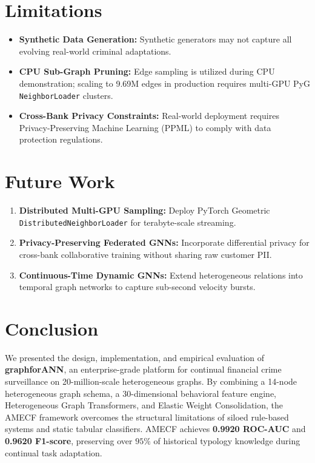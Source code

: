 \documentclass[conference]{IEEEtran}
\begin{document}
\section{Limitations}
\begin{itemize}
    \item \textbf{Synthetic Data Generation:} Synthetic generators may not capture all evolving real-world criminal adaptations.
    \item \textbf{CPU Sub-Graph Pruning:} Edge sampling is utilized during CPU demonstration; scaling to 9.69M edges in production requires multi-GPU PyG \texttt{NeighborLoader} clusters.
    \item \textbf{Cross-Bank Privacy Constraints:} Real-world deployment requires Privacy-Preserving Machine Learning (PPML) to comply with data protection regulations.
\end{itemize}

\section{Future Work}
\begin{enumerate}
    \item \textbf{Distributed Multi-GPU Sampling:} Deploy PyTorch Geometric \texttt{DistributedNeighborLoader} for terabyte-scale streaming.
    \item \textbf{Privacy-Preserving Federated GNNs:} Incorporate differential privacy for cross-bank collaborative training without sharing raw customer PII.
    \item \textbf{Continuous-Time Dynamic GNNs:} Extend heterogeneous relations into temporal graph networks to capture sub-second velocity bursts.
\end{enumerate}

\section{Conclusion}
We presented the design, implementation, and empirical evaluation of \textbf{graphforANN}, an enterprise-grade platform for continual financial crime surveillance on 20-million-scale heterogeneous graphs. By combining a 14-node heterogeneous graph schema, a 30-dimensional behavioral feature engine, Heterogeneous Graph Transformers, and Elastic Weight Consolidation, the AMECF framework overcomes the structural limitations of siloed rule-based systems and static tabular classifiers. AMECF achieves \textbf{0.9920 ROC-AUC} and \textbf{0.9620 F1-score}, preserving over $95\%$ of historical typology knowledge during continual task adaptation.



\end{document}
